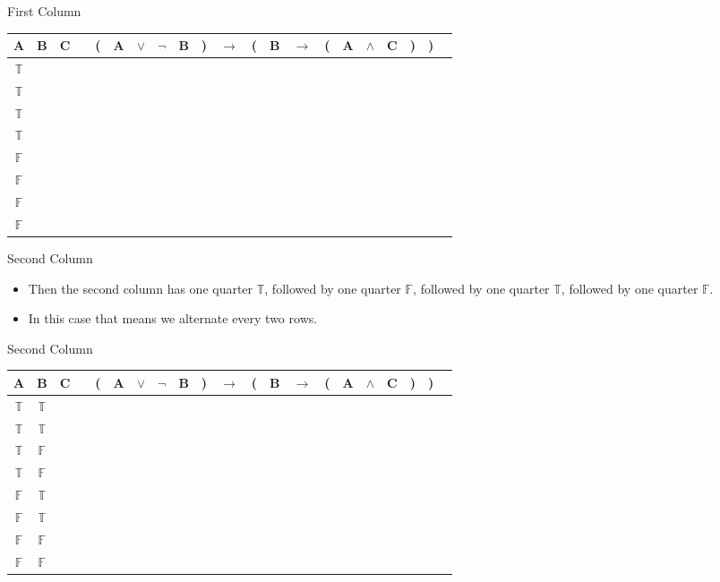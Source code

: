 \documentclass[
  ignorenonframetext,
]{beamer}
\providecommand{\tightlist}{%
  \setlength{\itemsep}{0pt}\setlength{\parskip}{0pt}}
\renewcommand{\,}{\text{, }}
\def\True{\mathbb{T}}
\def\False{\mathbb{F}}
\begin{document}
\begin{frame}{First Column}
\protect\hypertarget{first-column}{}

\begin{center}
\begin{tabular}{@{ }c@{ }@{ }c@{ }@{ }c | c@{ }@{}c@{}@{ }c@{ }@{ }c@{ }@{ }c@{ }@{ }c@{ }@{}c@{}@{ }c@{ }@{}c@{}@{ }c@{ }@{ }c@{ }@{}c@{}@{ }c@{ }@{ }c@{ }@{ }c@{ }@{}c@{}@{}c@{}@{ }c}
A & B & C &  & ( & A & $\vee$ & $\neg$ & B & ) & $\rightarrow$ & ( & B & $\rightarrow$ & ( & A & $\wedge$ & C & ) & ) & \\
\hline 
 $\True$ & & \\
 $\True$ & & \\
 $\True$ & & \\
 $\True$ & & \\
 $\False$ & &\\
 $\False$ & &\\
 $\False$ & &\\
 $\False$ & &\\
\end{tabular}
\end{center}

\end{frame}

\begin{frame}{Second Column}
\protect\hypertarget{second-column}{}

\begin{itemize}
\tightlist
\item
  Then the second column has one quarter \(\True\), followed by one
  quarter \(\False\), followed by one quarter \(\True\), followed by one
  quarter \(\False\).
\item
  In this case that means we alternate every two rows.
\end{itemize}

\end{frame}

\begin{frame}{Second Column}
\protect\hypertarget{second-column-1}{}

\begin{center}
\begin{tabular}{@{ }c@{ }@{ }c@{ }@{ }c | c@{ }@{}c@{}@{ }c@{ }@{ }c@{ }@{ }c@{ }@{ }c@{ }@{}c@{}@{ }c@{ }@{}c@{}@{ }c@{ }@{ }c@{ }@{}c@{}@{ }c@{ }@{ }c@{ }@{ }c@{ }@{}c@{}@{}c@{}@{ }c}
A & B & C &  & ( & A & $\lor$ & $\neg$ & B & ) & $\rightarrow$ & ( & B & $\rightarrow$ & ( & A & $\wedge$ & C & ) & ) & \\
\hline 
 $\True$ & $\True$ &\\
 $\True$ & $\True$ &\\
 $\True$ & $\False$ &\\
 $\True$ & $\False$ & \\
 $\False$ & $\True$ &\\
 $\False$ & $\True$ &\\
 $\False$ & $\False$ &\\
 $\False$ & $\False$ &\\
\end{tabular}
\end{center}

\end{frame}
\end{document}
